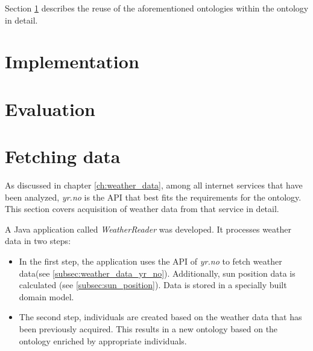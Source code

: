 
Section \ref{sec:implementation} describes the reuse of the aforementioned ontologies within the \thinkhomeweather ontology in detail.

\section{Implementation}
\label{sec:implementation}


\section{Evaluation}
\label{ch:ontology_evaluation}


\section{Fetching data}


As discussed in chapter \ref{ch:weather_data}, among all internet services that have been analyzed, \emph{yr.no} is the API that best fits the requirements for the \thinkhomeweather ontology. This section covers acquisition of weather data from that service in detail.

A Java application called \emph{WeatherReader} was developed. It processes weather data in two steps:

\begin{itemize}
  \item In the first step, the application uses the API of \emph{yr.no} to fetch weather data(see \ref{subsec:weather_data_yr_no}). Additionally, sun position data is calculated (see \ref{subsec:sun_position}). Data is stored in a specially built domain model. %
  \item The second step, individuals are created based on the weather data that has been previously acquired. This results in a new ontology based on the \thinkhomeweather ontology enriched by appropriate individuals.
\end{itemize}

